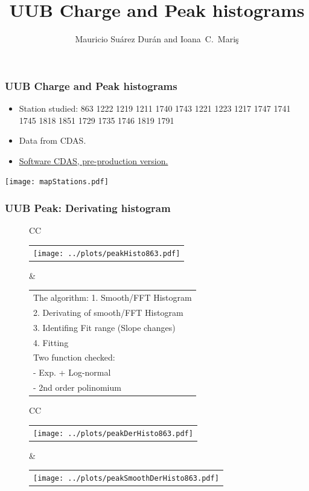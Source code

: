 \documentclass[aspectratio=169]{beamer}
\title{UUB Charge and Peak histograms}
\author{
  Mauricio Su\'arez Dur\'an and Ioana~C.~Mari\c{s}
}
\institute{IIHE-ULB}
\begin{document}
\begin{frame}
  \titlepage
\end{frame}


\begin{frame}
	\frametitle{UUB Charge and Peak histograms}
	\begin{itemize}
		\item Station studied: 863 1222 1219 1211 1740 1743 1221 1223 1217 1747 1741 1745 1818 1851 1729 1735 1746 1819 1791
		\item Data from CDAS.
		\item {\underline {Software CDAS, pre-production version.}}
	\end{itemize}
	\centering
	\texttt{[image: mapStations.pdf]}
\end{frame}


\begin{frame}
  \frametitle{UUB Peak: Derivating histogram} %
  \begin{figure}
    \centering
    \begin{tabularx}{\textwidth}{CC}
      \begin{tabular}{l}
        \texttt{[image: ../plots/peakHisto863.pdf]}
      \end{tabular}
      &
      \footnotesize
      \begin{tabular}{l}
        The algorithm:
        1. Smooth/FFT Histogram \\
        2. Derivating of smooth/FFT Histogram \\
        3. Identifing Fit range (Slope changes) \\
        4. Fitting \\
        Two function checked: \\
        - Exp. + Log-normal \\
        - 2nd order polinomium
      \end{tabular}
    \end{tabularx}

    \begin{tabularx}{\textwidth}{CC}
      \begin{tabular}{l}
        \texttt{[image: ../plots/peakDerHisto863.pdf]}
      \end{tabular}
      &
      \begin{tabular}{l}
        \texttt{[image: ../plots/peakSmoothDerHisto863.pdf]}
      \end{tabular}
    \end{tabularx}
  \end{figure}
\end{frame}
\end{document}
